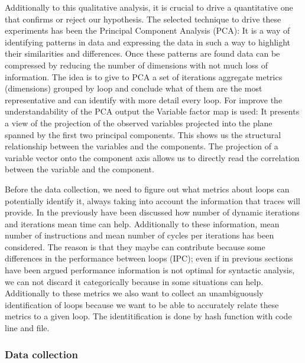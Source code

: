 Additionally to this qualitative analysis, it is crucial to drive a quantitative
one that confirms or reject our hypothesis. The selected technique to drive these
experiments has been the Principal Component Analysis (PCA): It is a way of
identifying patterns in data and expressing the data in such a way to highlight
their similarities and differences. Once these patterns are found data can be
compressed by reducing the number of dimensions with not much loss of
information. The idea is to give to PCA a set of iterations aggregate metrics
 (dimensions) grouped by loop and conclude what of them are 
the most representative and can identify with more detail every loop. For improve
the understandability of the PCA output the Variable factor map is used: It
presents a view of the projection of the observed variables projected into the
plane spanned by the first two principal components. This shows us the
structural relationship between the variables and the components. The projection
of a variable vector onto the component axis allows us to directly read the
correlation between the variable and the component.

Before the data collection, we need to figure out what metrics about loops can potentially
identify it, always taking into account the information that traces will provide. In
the previously have been discussed how number of dynamic iterations and
iterations mean time can help. Additionally to these information, mean number of 
instructions and mean number of cycles per iterations has been considered. The
reason is that they maybe can contribute because some differences in the
performance between loops (IPC); even if in previous sections have been argued
performance information is not optimal for syntactic analysis, we can not
discard it categorically because in some situations can help. Additionally to
these metrics we also want to collect an unambiguously identification of loops
because we want to be able to accurately relate these metrics to a given loop.
The identitification is done by hash function with code line and file.

\subsubsection{Data collection}

